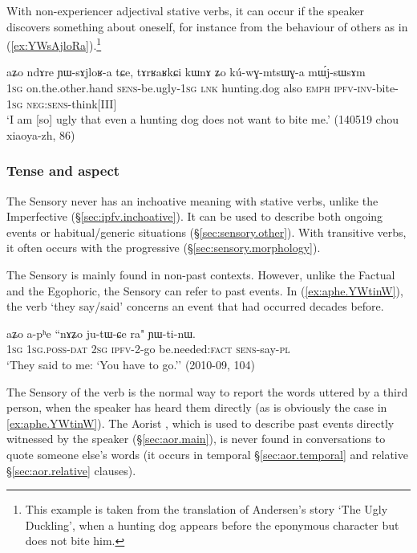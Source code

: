 With non-experiencer adjectival stative verbs, it can occur if the speaker discovers something about oneself, for instance from the behaviour of others as in (\ref{ex:YWsAjloRa}).\footnote{This example is taken from the translation of Andersen's story `The Ugly Duckling', when a hunting dog appears before the eponymous character but does not bite him. }

\begin{exe}
\ex \label{ex:YWsAjloRa}
\gll  aʑo ndɤre ɲɯ-sɤjloʁ-a tɕe, tɤrʁaʁkɕi kɯnɤ ʑo kú-wɣ-mtsɯɣ-a mɯ́j-sɯsɤm \\
\textsc{1sg} on.the.other.hand \textsc{sens}-be.ugly-\textsc{1sg} \textsc{lnk} hunting.dog also \textsc{emph} \textsc{ipfv}-\textsc{inv}-bite-\textsc{1sg} \textsc{neg}:\textsc{sens}-think[III] \\
\glt `I am [so] ugly that even a hunting dog does not want to bite me.'  (140519 chou xiaoya-zh, 86)
\end{exe}

 
\subsubsection{Tense and aspect} \label{sec:sensory.functions}
The Sensory never has an inchoative meaning with stative verbs, unlike the Imperfective (§\ref{sec:ipfv.inchoative}). It can be used to describe both ongoing events or habitual/generic situations (§\ref{sec:sensory.other}).
With transitive verbs, it often occurs with the progressive (§\ref{sec:sensory.morphology}). 

The Sensory is mainly found in non-past contexts. However, unlike the Factual and the Egophoric, the Sensory can refer to past events. In (\ref{ex:aphe.YWtinW}), the verb  `they say/said' concerns an event that had occurred decades before.

\begin{exe}
\ex \label{ex:aphe.YWtinW}
\gll  aʑo a-pʰe ``nɤʑo ju-tɯ-ɕe ra" ɲɯ-ti-nɯ. \\
\textsc{1sg} \textsc{1sg}.\textsc{poss}-\textsc{dat} \textsc{2sg} \textsc{ipfv}-2-go be.needed:\textsc{fact} \textsc{sens}-say-\textsc{pl} \\
\glt  `They said to me: `You have to go.'' (2010-09, 104)
\end{exe}

The Sensory  of the verb  is the normal way to report the words uttered by a third person, when the speaker has heard them directly (as is obviously the case in \ref{ex:aphe.YWtinW}). The Aorist , which is used to describe past events directly witnessed by the speaker (§\ref{sec:aor.main}), is never found in conversations to quote someone else's words (it occurs in temporal §\ref{sec:aor.temporal} and relative §\ref{sec:aor.relative} clauses).

